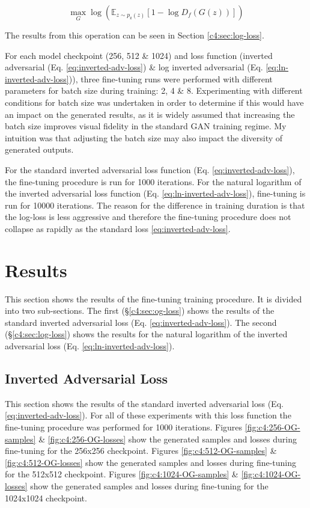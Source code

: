 \begin{equation} 
  \max_{G}\log(\mathbb{E}_{z\sim p_{\text{z}}(z)}[1 - \log{D_{f}(G(z))}])
  \label{eq:ln-inverted-adv-loss}
  \end{equation}

The results from this operation can be seen in Section \ref{c4:sec:log-loss}.

For each model checkpoint (256, 512 \& 1024) and loss function (inverted adversarial (Eq. \ref{eq:inverted-adv-loss}) \& log inverted adversarial (Eq. \ref{eq:ln-inverted-adv-loss})), three fine-tuning runs were performed with different parameters for batch size during training: 2, 4 \& 8.
Experimenting with different conditions for batch size was undertaken in order to determine if this would have an impact on the generated results, as it is widely assumed that increasing the batch size improves visual fidelity in the standard GAN training regime. 
My intuition was that adjusting the batch size may also impact the diversity of generated outputs.

For the standard inverted adversarial loss function (Eq. \ref{eq:inverted-adv-loss}), the fine-tuning procedure is run for 1000 iterations.
For the natural logarithm of the inverted adversarial loss function (Eq. \ref{eq:ln-inverted-adv-loss}), fine-tuning is run for 10000 iterations.
The reason for the difference in training duration is that the log-loss is less aggressive and therefore the fine-tuning procedure does not collapse as rapidly as the standard loss \ref{eq:inverted-adv-loss}.

\section{Results}
\label{c4:sec:results}

This section shows the results of the fine-tuning training procedure. 
It is divided into two sub-sections.
The first (\S \ref{c4:sec:og-loss}) shows the results of the standard inverted adversarial loss (Eq. \ref{eq:inverted-adv-loss}).
The second (\S \ref{c4:sec:log-loss}) shows the results for the natural logarithm of the inverted adversarial loss (Eq. \ref{eq:ln-inverted-adv-loss}).

\subsection{Inverted Adversarial Loss}
\FloatBarrier

This section shows the results of the standard inverted adversarial loss (Eq. \ref{eq:inverted-adv-loss}). For all of these experiments with this loss function the fine-tuning procedure was performed for 1000 iterations.
Figures \ref{fig:c4:256-OG-samples} \& \ref{fig:c4:256-OG-losses} show the generated samples and losses during fine-tuning for the 256x256 checkpoint.
Figures \ref{fig:c4:512-OG-samples} \& \ref{fig:c4:512-OG-losses} show the generated samples and losses during fine-tuning for the 512x512 checkpoint.
Figures \ref{fig:c4:1024-OG-samples} \& \ref{fig:c4:1024-OG-losses} show the generated samples and losses during fine-tuning for the 1024x1024 checkpoint.

